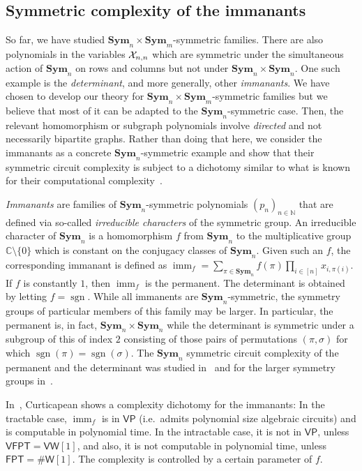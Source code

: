 \documentclass[10pt,a4paper]{article}
\theoremstyle{definition}
\theoremstyle{plain}
\theoremstyle{remark}
\newcommand{\Xx}{{\cal X}}
\newcommand{\Sym}{\mathbf{Sym}}
\newcommand{\bbN}{\mathbb{N}}
\DeclareMathOperator{\imm}{imm}
\DeclareMathOperator{\sgn}{sgn}
\newcommand{\VP}{\mathsf{VP}}
\newcommand{\VFPT}{\mathsf{VFPT}}
\newcommand{\VW}{\mathsf{VW}[1]}
\newcommand{\FPT}{\mathsf{FPT}}
\newcommand{\sharpW}{\#\mathsf{W}[1]}
\begin{document}
\subsection{Symmetric complexity of the immanants}
So far, we have studied $\Sym_n \times \Sym_m$-symmetric families. There are also polynomials in the variables $\Xx_{n,n}$ which are symmetric under the simultaneous action of $\Sym_n$ on rows and columns but not under $\Sym_n \times \Sym_n$.  One such example is the \emph{determinant}, and more generally, other \emph{immanants}. 
We have chosen to develop our theory for $\Sym_n \times
\Sym_m$-symmetric families but we believe that most of it can be
adapted to the $\Sym_n$-symmetric case. Then, the relevant
homomorphism or subgraph polynomials involve \emph{directed} and not
necessarily bipartite graphs. Rather than doing that here, we consider
the immanants as a concrete $\Sym_n$-symmetric example and show that
their symmetric circuit complexity is subject to a dichotomy similar
to what is known for their computational complexity~\cite{curticapean2021full}.  
 
\emph{Immanants} are families of $\Sym_n$-symmetric polynomials
$(p_n)_{n \in \bbN}$ that are defined via so-called \emph{irreducible
  characters} of the symmetric group. An irreducible character of
$\Sym_n$ is a homomorphism $f$ from $\Sym_n$ to the multiplicative group
$\mathbb{C}\setminus\{0\}$ which is constant on the conjugacy classes
of $\Sym_n$.  Given such an $f$, the corresponding immanant is defined as
$
\imm_{f} = \sum_{\pi \in \Sym_n} f(\pi) \prod_{i \in [n]} x_{i,\pi(i)}.
$
If $f$ is constantly $1$, then $\imm_f$ is the permanent. The
determinant is obtained by letting $f = \sgn$.  While all immanents are
$\Sym_n$-symmetric, the symmetry groups of particular members of this
family may be larger.  In particular, the permanent is, in fact,
$\Sym_n \times \Sym_n$ while the determinant is symmetric under a
subgroup of this of index $2$ consisting of those pairs of
permutations $(\pi,\sigma)$ for which $\sgn(\pi) = \sgn(\sigma)$.  The
$\Sym_n$ symmetric circuit complexity of the permanent and the determinant was
studied in~\cite{dawar_symmetric_2025} and for the larger symmetry
groups in~\cite{dawar2021lower}.

In~\cite{curticapean2021full}, Curticapean shows a complexity dichotomy for the immanants: In the tractable case, $\imm_{f}$ is in $\VP$ (i.e.\ admits polynomial size algebraic circuits) and is computable in polynomial time. In the intractable case, it is not in $\VP$, unless $\VFPT = \VW$, and also, it is not computable in polynomial time, unless $\FPT = \sharpW$. The complexity is controlled by a certain parameter of $f$. 
\end{document}
